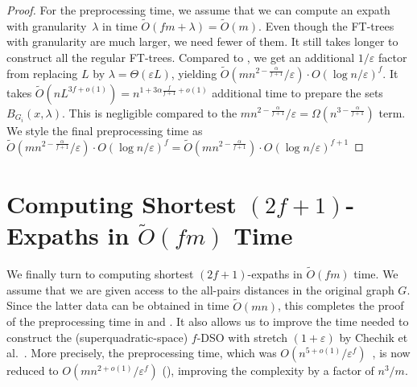 \documentclass{theoretics}
\newcommand*{\Otilde}{\widetilde{O}}
\newcommand{\eps}{\varepsilon}
\begin{document}
\begin{proof}
	For the preprocessing time, we assume that we can compute an expath with granularity~$\lambda$
	in time $\Otilde(fm + \lambda) = \Otilde(m)$.
	Even though the FT-trees with granularity are much larger, we need fewer of them.
	It still takes longer to construct all the regular FT-trees.
	Compared to , we get an additional $1/\varepsilon$
	factor from replacing $L$ by $\lambda = \Theta(\varepsilon L)$,
	yielding 
	$\Otilde(mn^{2-\frac{\alpha}{f+1}}/\varepsilon)
  	\cdot O(\log n/\varepsilon)^{f}$.
	It takes $\Otilde(nL^{3f+o(1)}) = n^{1+3\alpha \frac{f}{f+1}+o(1)}$ additional time
	to prepare the sets $B_{G_i}(x,\lambda)$.
	This is negligible compared to the 
	$mn^{2-\frac{\alpha}{f+1}}/\varepsilon = \Omega(n^{3-\frac{\alpha}{f+1}})$ term.
	We style the final preprocessing time as 
	$\Otilde(mn^{2-\frac{\alpha}{f+1}}/\varepsilon)
  	\cdot O(\log n/\varepsilon)^{f} =  	
  	\Otilde(mn^{2-\frac{\alpha}{f+1}})
  	\cdot O(\log n/\varepsilon)^{f+1}$
\end{proof}


\section{Computing Shortest \texorpdfstring{$(2f{+}1)$}{(2f+1)}-Expaths in \texorpdfstring{$\Otilde(fm)$}{Õ(fm)} Time}
\label{sec:improved_preproc} 

We finally turn to computing shortest $(2f{+}1)$-expaths in $\Otilde(fm)$ time.
We assume that we are given access to the all-pairs distances in the original graph $G$.
Since the latter data can be obtained in time $\Otilde(mn)$, this completes the proof of the preprocessing time in
 and .
It also allows us to improve the time needed to construct the (superquadratic-space) $f$-DSO with stretch $(1+\eps)$ by Chechik et al.~\cite{ChCoFiKa17}.
More precisely, the preprocessing time, which was $O(n^{5+o(1)}/\varepsilon^f)$~\cite{ChCoFiKa17},
is now reduced to $O(mn^{2+o(1)}/\varepsilon^f)$ (),
improving the complexity by a factor of $n^3/m$.
\end{document}
